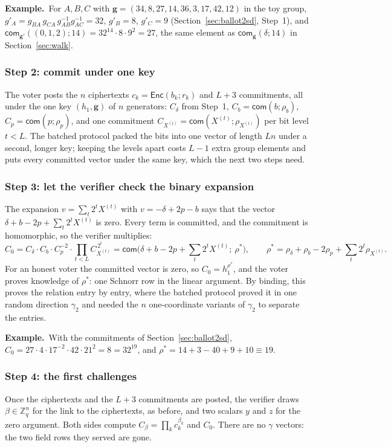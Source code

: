 \documentclass[11pt,a4paper]{article}
\newcommand{\Z}{\mathbb{Z}}
\newcommand{\Enc}{\mathsf{Enc}}
\newcommand{\com}{\mathsf{com}}
\newcommand{\ex}[1]{\par\medskip\noindent\textbf{Example.}~#1\par\medskip}
\theoremstyle{remark}
\begin{document}
\ex{For $A, B, C$ with $\mathbf{g} = (34, 8, 27, 14, 36, 3, 17, 42, 12)$ in
the toy group, $g'_A = g_{BA}\, g_{CA}\, g_{AB}^{-1} g_{AC}^{-1} = 32$,
$g'_B = 8$, $g'_C = 9$ (Section~\ref{sec:ballot2sd}, Step~1), and
$\com_{\mathbf{g}'}((0, 1, 2); 14) = 32^{14} \cdot 8 \cdot 9^2 = 27$, the
same element as $\com_{\mathbf{g}}(\delta; 14)$ in
Section~\ref{sec:walk}.}

\subsubsection*{Step 2: commit under one key}
The voter posts the $n$ ciphertexts $c_k = \Enc(b_k; r_k)$ and $L + 3$
commitments, all under the one key $(h_1, \mathbf{g})$ of $n$ generators:
$C_\delta$ from Step~1, $C_b = \com(b; \rho_b)$, $C_p = \com(p;
\rho_p)$, and one commitment $C_{X^{(t)}} = \com(X^{(t)};
\rho_{X^{(t)}})$ per bit level $t < L$. The batched protocol packed the
bits into one vector of length $Ln$ under a second, longer key; keeping
the levels apart costs $L - 1$ extra group elements and puts every
committed vector under the same key, which the next two steps need.

\subsubsection*{Step 3: let the verifier check the binary expansion}
The expansion $v = \sum_t 2^t X^{(t)}$ with $v = -\delta + 2p - b$ says
that the vector $\delta + b - 2p + \sum_t 2^t X^{(t)}$ is zero. Every
term is committed, and the commitment is homomorphic, so the verifier
multiplies:
\[
  C_0 = C_\delta \cdot C_b \cdot C_p^{-2} \cdot \prod_{t < L} C_{X^{(t)}}^{\,2^t}
  = \com\Big(\delta + b - 2p + \textstyle\sum_t 2^t X^{(t)};\ \rho^*\Big),
  \qquad
  \rho^* = \rho_\delta + \rho_b - 2\rho_p + \textstyle\sum_t 2^t \rho_{X^{(t)}} .
\]
For an honest voter the committed vector is zero, so $C_0 = h_1^{\rho^*}$,
and the voter proves knowledge of $\rho^*$: one Schnorr row in the linear
argument. By binding, this proves the relation entry by entry, where the
batched protocol proved it in one random direction $\gamma_2$ and needed
the $n$ one-coordinate variants of $\gamma_2$ to separate the entries.

\ex{With the commitments of Section~\ref{sec:ballot2sd}, $C_0 = 27
\cdot 4 \cdot 17^{-2} \cdot 42 \cdot 21^{2} = 8 = 32^{19}$, and $\rho^*
= 14 + 3 - 40 + 9 + 10 \equiv 19$.}

\subsubsection*{Step 4: the first challenges}
Once the ciphertexts and the $L + 3$ commitments are posted, the verifier
draws $\beta \in \Z_q^{n}$ for the link to the ciphertexts, as before,
and two scalars $y$ and $z$ for the zero argument. Both sides compute
$C_\beta = \prod_k c_k^{\beta_k}$ and $C_0$. There are no $\gamma$
vectors: the two field rows they served are gone.
\end{document}
